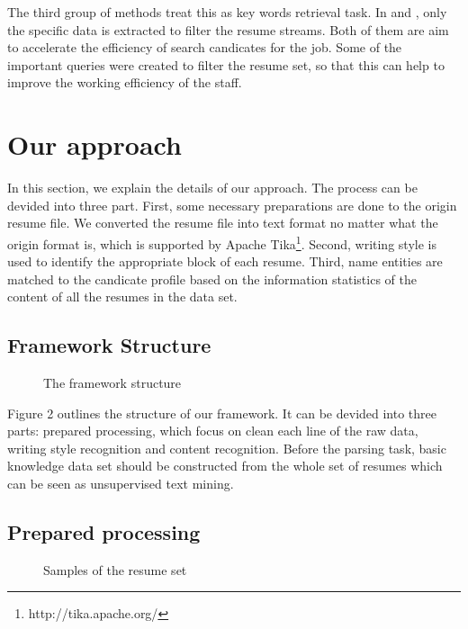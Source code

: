 \documentclass{acm_proc_article-sp}
\begin{document}
The third group of methods treat this as key words retrieval task.
In \cite{kopparapu2010automatic} and \cite{maheshwari2010approach}, only the specific data is extracted to filter the resume streams. 
Both of them are aim to accelerate the efficiency of search candicates for the job.
Some of the important queries were created to filter the resume set, so that this can help to improve the working efficiency of the staff.


\section{Our approach}\label{our-approach}

In this section, we explain the details of our approach. 
The process can be devided into three part. 
First, some necessary preparations are done to the origin resume file. 
We converted the resume file into text format no matter what the origin format is, which is supported by Apache Tika\footnote{http://tika.apache.org/}. 
Second, writing style is used to identify the appropriate  block of each resume.
Third, name entities are matched to the candicate profile based on the information statistics of the content of all the resumes in the data set. 

\subsection{Framework Structure}

\begin{figure}\label{frame-struct}
\centering
{}
\caption{The framework structure}
\end{figure}

Figure 2 outlines the structure of our framework.
It can be devided into three parts: prepared processing, which focus on clean each line of the raw data, writing style recognition and content recognition.
Before the parsing task, basic knowledge data set should be constructed from the whole set of resumes which can be seen as unsupervised text mining.

\subsection{Prepared processing}

\begin{figure*}\label{resumes-sample}
\centering
{}
\caption{Samples of the resume set}
\end{figure*}
\end{document}
